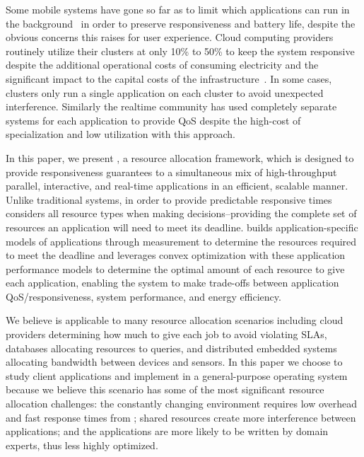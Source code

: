Some mobile systems have gone so far as to limit which applications can run in the background~\cite{iOsDev} in order to preserve responsiveness and battery life, despite the obvious concerns this raises for user experience.  Cloud computing providers routinely utilize their clusters at only 10\% to 50\% to keep the system responsive despite the additional operational costs of consuming electricity and the significant impact to the capital costs of the infrastructure~\cite{Barroso2009,Hennessy2011}.   In some cases, clusters only run a single application on each cluster to avoid unexpected interference.  Similarly the realtime community has used completely separate systems for each application to provide QoS despite the high-cost of specialization and low utilization with this approach.

In this paper, we present \pacora, a resource allocation framework, which is designed to provide responsiveness guarantees to a simultaneous mix of high-throughput parallel, interactive, and real-time applications in an efficient, scalable manner.  Unlike traditional systems, in order to provide predictable responsive times \pacora considers all resource types when making decisions--providing the complete set of resources an application will need to meet its deadline.   \pacora builds application-specific models of applications through measurement to determine the resources required to meet the deadline and leverages convex optimization with these application performance models to determine the optimal amount of each resource to give each application, enabling the system to make trade-offs between application QoS/responsiveness, system performance, and energy efficiency. 

We believe \pacora is applicable to many resource allocation scenarios including cloud providers determining how much to give each job to avoid violating SLAs, databases allocating resources to queries, and distributed embedded systems allocating bandwidth between devices and sensors.  In this paper we choose to study client applications and implement \pacora in a general-purpose operating system because we believe this scenario has some of the most significant resource allocation challenges: the constantly changing environment requires low overhead and fast response times from \pacora;  shared resources create more interference between applications; and the applications are more likely to be written by domain experts, thus less highly optimized.


